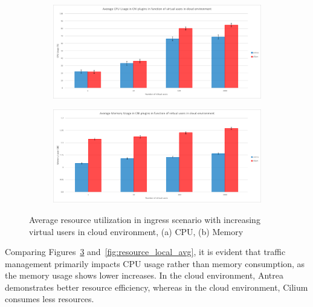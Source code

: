 \begin{figure}[H]
    \centering
    \begin{subfigure}[b]{0.8\textwidth}
        \includegraphics[width=\textwidth]{plots/traffic-splitting/cpu_cloud.png}
        \caption{}
        \label{fig:cpu_cloud_avg}
    \end{subfigure}
    \begin{subfigure}[b]{0.8\textwidth}
        \includegraphics[width=\textwidth]{plots/traffic-splitting/memory_cloud.png}
        \caption{}
        \label{fig:memory_cloud_avg}
    \end{subfigure}
    
    \caption{Average resource utilization in ingress scenario with increasing virtual users in cloud environment, (a) CPU, (b) Memory}
    \label{fig:resource_cloud_avg}
\end{figure}

Comparing Figures~\ref{fig:resource_cloud_avg} and~\ref{fig:resource_local_avg}, it is evident that traffic management primarily impacts CPU usage rather than memory consumption, as the memory usage shows lower increases. In the cloud environment, Antrea demonstrates better resource efficiency, whereas in the cloud environment, Cilium consumes less resources.


